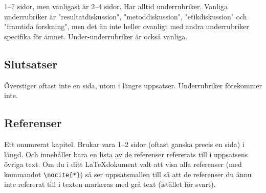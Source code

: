 1--7 sidor, men vanligast är 2--4 sidor. Har alltid underrubriker. Vanliga
underrubriker är "resultatdiskussion", "metoddiskussion", "etikdiskussion" och
"framtida forskning", men det än inte heller ovanligt med andra underrubriker
specifika för ämnet. Under-underrubriker är också vanliga.


\subsection{Slutsatser}
\label{rubrik.slutsats}

Överstiger oftast inte en sida, utom i längre uppsatser. Underrubriker
förekommer inte.


\subsection{Referenser}
\label{rubrik.referenser}

Ett onumrerat kapitel. Brukar vara 1--2 sidor (oftast ganska precis en sida) i
längd. Och innehåller bara en lista av de referenser refererats till i
uppsatsens övriga text. Om du i ditt \LaTeX dokument valt att visa alla
referenser (med kommandot \verb|\nocite{*}|) så ser uppsatsmallen till så att
de referenser du ännu inte refererat till i texten markeras med grå text
(istället för svart).

